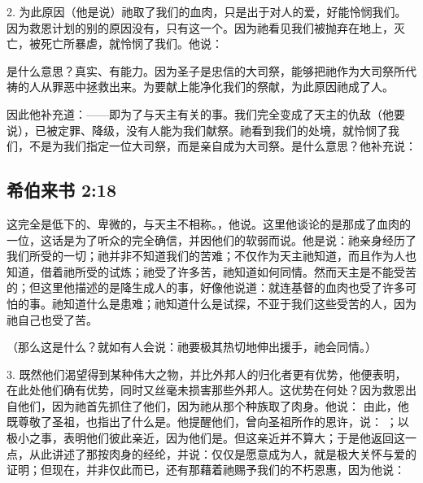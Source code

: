2.  为此原因（他是说）祂取了我们的血肉，只是出于对人的爱，好能怜悯我们。因为救恩计划的别的原因没有，只有这一个。因为祂看见我们被抛弃在地上，灭亡，被死亡所暴虐，就怜悯了我们。他说：\par

是什么意思？真实、有能力。因为圣子是忠信的大司祭，能够把祂作为大司祭所代祷的人从罪恶中拯救出来。为要献上能净化我们的祭献，为此原因祂成了人。\par

因此他补充道：——即为了与天主有关的事。我们完全变成了天主的仇敌（他要说），已被定罪、降级，没有人能为我们献祭。祂看到我们的处境，就怜悯了我们，不是为我们指定一位大司祭，而是亲自成为大司祭。是什么意思？他补充说：\par


\subsection{希伯来书 2:18}

 这完全是低下的、卑微的，与天主不相称。，他说。这里他谈论的是那成了血肉的一位，这话是为了听众的完全确信，并因他们的软弱而说。他是说：祂亲身经历了我们所受的一切；祂并非不知道我们的苦难；不仅作为天主祂知道，而且作为人也知道，借着祂所受的试炼；祂受了许多苦，祂知道如何同情。然而天主是不能受苦的；但这里他描述的是降生成人的事，好像他说道：就连基督的血肉也受了许多可怕的事。祂知道什么是患难；祂知道什么是试探，不亚于我们这些受苦的人，因为祂自己也受了苦。\par

（那么这是什么？就如有人会说：祂要极其热切地伸出援手，祂会同情。）\par

3. 既然他们渴望得到某种伟大之物，并比外邦人的归化者更有优势，他便表明，在此处他们确有优势，同时又丝毫未损害那些外邦人。这优势在何处？因为救恩出自他们，因为祂首先抓住了他们，因为祂从那个种族取了肉身。他说：  由此，他既尊敬了圣祖，也指出了什么是。他提醒他们，曾向圣祖所作的恩许，说： ；以极小之事，表明他们彼此亲近，因为他们是。但这亲近并不算大；于是他返回这一点，从此讲述了那按肉身的经纶，并说：仅仅是愿意成为人，就是极大关怀与爱的证明；但现在，并非仅此而已，还有那藉着祂赐予我们的不朽恩惠，因为他说：\par

